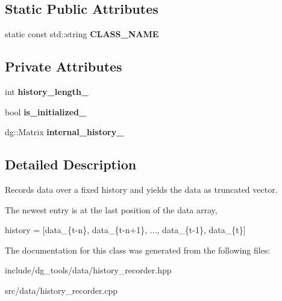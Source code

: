 \subsection*{Static Public Attributes}
\begin{DoxyCompactItemize}
\item 
static const std\+::string {\bfseries C\+L\+A\+S\+S\+\_\+\+N\+A\+ME}\hypertarget{classdg__tools_1_1HistoryRecorder_a490b6fb59e2fa5957466a4a78ca619dd}{}\label{classdg__tools_1_1HistoryRecorder_a490b6fb59e2fa5957466a4a78ca619dd}

\end{DoxyCompactItemize}
\subsection*{Private Attributes}
\begin{DoxyCompactItemize}
\item 
int {\bfseries history\+\_\+length\+\_\+}\hypertarget{classdg__tools_1_1HistoryRecorder_a210504be4f47b6663905abf4ea371f0a}{}\label{classdg__tools_1_1HistoryRecorder_a210504be4f47b6663905abf4ea371f0a}

\item 
bool {\bfseries is\+\_\+initialized\+\_\+}\hypertarget{classdg__tools_1_1HistoryRecorder_ae328c1c110447c822ba44fd90d90ae96}{}\label{classdg__tools_1_1HistoryRecorder_ae328c1c110447c822ba44fd90d90ae96}

\item 
dg\+::\+Matrix {\bfseries internal\+\_\+history\+\_\+}\hypertarget{classdg__tools_1_1HistoryRecorder_af2c34bb0fd019ac233305c61eb506476}{}\label{classdg__tools_1_1HistoryRecorder_af2c34bb0fd019ac233305c61eb506476}

\end{DoxyCompactItemize}


\subsection{Detailed Description}
Records data over a fixed history and yields the data as truncated vector. 

The newest entry is at the last position of the data array,

history = \mbox{[}data\+\_\+\{t-\/n\}, data\+\_\+\{t-\/n+1\}, ..., data\+\_\+\{t-\/1\}, data\+\_\+\{t\}\mbox{]} 

The documentation for this class was generated from the following files\+:\begin{DoxyCompactItemize}
\item 
include/dg\+\_\+tools/data/history\+\_\+recorder.\+hpp\item 
src/data/history\+\_\+recorder.\+cpp\end{DoxyCompactItemize}
